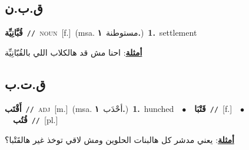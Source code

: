 \documentclass[10pt,a4paper,twoside]{article} %
\begin{document}
\begin{multicols}{2}
\vspace{-3mm}
\subsection*{\color{blue}\foreignlanguage{arabic}{ق.ب.ن}\color{blue}{}} 

{\setlength\topsep{0pt}\textbf{\foreignlanguage{arabic}{قُبَّانِيِّة}}\ {\color{gray}\texttt{//}\color{black}}\ \textsc{noun}\ [f.]\ \color{gray}(msa. \foreignlanguage{arabic}{مستوطنة}~\foreignlanguage{arabic}{\textbf{١.}})\color{black}\ \textbf{1.}~settlement\  \begin{flushright}\color{gray}\foreignlanguage{arabic}{\textbf{\underline{\foreignlanguage{arabic}{أمثلة}}}: احنا مش قد هالكلاب اللي بالقُبّانِيِّة}\end{flushright}\color{black}} \vspace{2mm}

\vspace{-3mm}
\subsection*{\color{blue}\foreignlanguage{arabic}{ق.ت.ب}\color{blue}{}} 

{\setlength\topsep{0pt}\textbf{\foreignlanguage{arabic}{أَقْتَب}}\ {\color{gray}\texttt{//}\color{black}}\ \textsc{adj}\ [m.]\ \color{gray}(msa. \foreignlanguage{arabic}{أحْدَب}~\foreignlanguage{arabic}{\textbf{١.}})\color{black}\ \textbf{1.}~hunched\ \ $\bullet$\ \ \setlength\topsep{0pt}\textbf{\foreignlanguage{arabic}{قَتْبَا}}\ {\color{gray}\texttt{//}\color{black}}\ [f.]\ \ $\bullet$\ \ \setlength\topsep{0pt}\textbf{\foreignlanguage{arabic}{قُتُب}}\ {\color{gray}\texttt{//}\color{black}}\ [pl.]\  \begin{flushright}\color{gray}\foreignlanguage{arabic}{\textbf{\underline{\foreignlanguage{arabic}{أمثلة}}}: يعني مدشر كل هالبنات الحلوين ومش لاقي توخذ غير هالقَتْبا؟}\end{flushright}\color{black}} \vspace{2mm}


\end{multicols}
\end{document}

